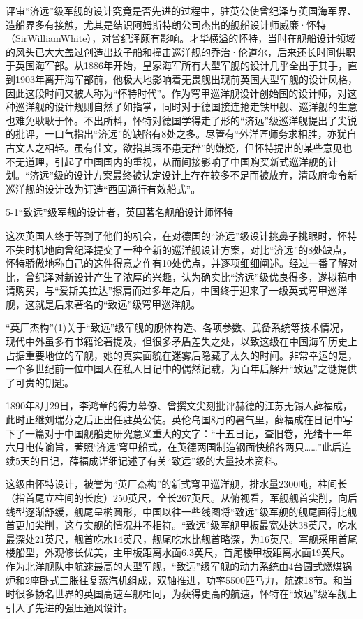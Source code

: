 \documentclass[12pt,UTF8]{ctexbook}
\begin{document}
评审“济远”级军舰的设计究竟是否先进的过程中，驻英公使曾纪泽与英国海军界、造船界多有接触，尤其是结识阿姆斯特朗公司杰出的舰船设计师威廉·怀特（SirWilliamWhite），对曾纪泽颇有影响。才华横溢的怀特，当时在舰船设计领域的风头已大大盖过创造出蚊子船和撞击巡洋舰的乔治·伦道尔，后来还长时间供职于英国海军部。从1886年开始，皇家海军所有大型军舰的设计几乎全出于其手，直到1903年离开海军部前，他极大地影响着无畏舰出现前英国大型军舰的设计风格，因此这段时间又被人称为“怀特时代”。作为穹甲巡洋舰设计创始国的设计师，对这种巡洋舰的设计规则自然了如指掌，同时对于德国接连抢走铁甲舰、巡洋舰的生意也难免耿耿于怀。不出所料，怀特对德国学得走了形的“济远”级巡洋舰提出了尖锐的批评，一口气指出“济远”的缺陷有8处之多。尽管有“外洋匠师务求相胜，亦犹自古文人之相轻。虽有佳文，欲指其瑕不患无辞”的嫌疑，但怀特提出的某些意见也不无道理，引起了中国国内的重视，从而间接影响了中国购买新式巡洋舰的计划。“济远”级的设计方案最终被认定设计上存在较多不足而被放弃，清政府命令新巡洋舰的设计改为订造“西国通行有效船式”。

5-1“致远”级军舰的设计者，英国著名舰船设计师怀特

这次英国人终于等到了他们的机会，在对德国的“济远”级设计挑鼻子挑眼时，怀特不失时机地向曾纪泽提交了一种全新的巡洋舰设计方案，对比“济远”的8处缺点，怀特骄傲地称自己的这件得意之作有10处优点，并逐项细细阐述。经过一番了解对比，曾纪泽对新设计产生了浓厚的兴趣，认为确实比“济远”级优良得多，遂拟稿申请购买，与“爱斯美拉达”擦肩而过多年之后，中国终于迎来了一级英式穹甲巡洋舰，这就是后来著名的“致远”级穹甲巡洋舰。

“英厂杰构”(1)关于“致远”级军舰的舰体构造、各项参数、武备系统等技术情况，现代中外虽多有书籍论著提及，但很多矛盾差失之处，以致这级在中国海军历史上占据重要地位的军舰，她的真实面貌在迷雾后隐藏了太久的时间。非常幸运的是，一个多世纪前一位中国人在私人日记中的偶然记载，为百年后解开“致远”之谜提供了可贵的钥匙。

1890年8月29日，李鸿章的得力幕僚、曾撰文尖刻批评赫德的江苏无锡人薛福成，此时正继刘瑞芬之后正出任驻英公使。英伦岛国8月的暑气里，薛福成在日记中写下了一篇对于中国舰船史研究意义重大的文字：“十五日记，查旧卷，光绪十一年六月电传谕旨，著照‘济远’穹甲船式，在英德两国制造钢面快船各两只……”此后连续5天的日记，薛福成详细记述了有关“致远”级的大量技术资料。

这级由怀特设计，被誉为“英厂杰构”的新式穹甲巡洋舰，排水量2300吨，柱间长（指首尾立柱间的长度）250英尺，全长267英尺。从俯视看，军舰舰首尖削，向后线型逐渐舒缓，舰尾呈椭圆形，中国以往一些线图将“致远”级军舰的舰尾画得比舰首更加尖削，这与实舰的情况并不相符。“致远”级军舰甲板最宽处达38英尺，吃水最深处21英尺，舰首吃水14英尺，舰尾吃水比舰首略深，为16英尺。军舰采用首尾楼船型，外观修长优美，主甲板距离水面6.3英尺，首尾楼甲板距离水面19英尺。作为北洋舰队中航速最高的大型军舰，“致远”级军舰的动力系统由4台圆式燃煤锅炉和2座卧式三胀往复蒸汽机组成，双轴推进，功率5500匹马力，航速18节。和当时很多扬名世界的英国高速军舰相同，为获得更高的航速，怀特在“致远”级军舰上引入了先进的强压通风设计。
\end{document}
